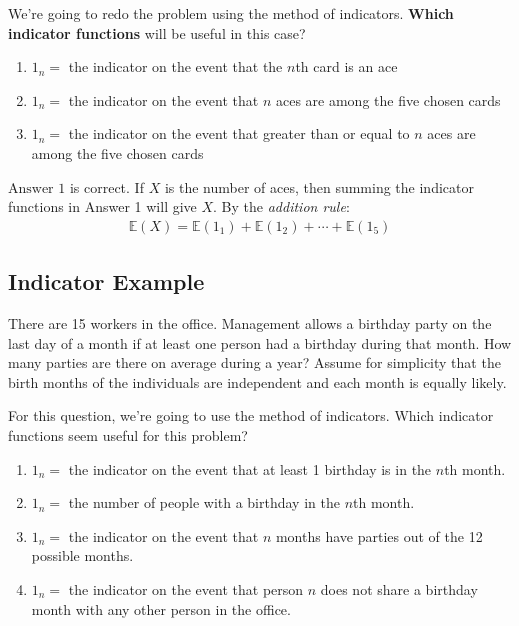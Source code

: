 \documentclass[titlepage, 12pt, leqno]{article}
\begin{document}
\begin{ex}
    We're going to redo the problem using the method of indicators. \textbf{Which 
    indicator functions} will be useful in this case?
    \begin{enumerate}
        \item $1_n = $ the indicator on the event that the $n$th card is an ace
        \item $1_n =$ the indicator on the event that $n$ aces are among the
            five chosen cards
        \item $1_n =$ the indicator on the event that greater than or equal to
            $n$ aces are among the five chosen cards
    \end{enumerate}
    \vspace{10px}
    $\boxed{ \text{Answer 1}}$ is correct. If $X$ is the number of aces, then
    summing the indicator functions in Answer 1 will give $X$. By the
    \textit{addition rule}:
   \begin{align*}
       \mathbb{E}(X) = \mathbb{E}(1_1) + \mathbb{E}(1_2) + \cdots + 
       \mathbb{E}(1_5)
   \end{align*}
\end{ex}

\pagebreak
\subsection{Indicator Example}
There are 15 workers in the office. Management allows a birthday party on the 
last day of a month if at least one person had a birthday during that month. How
many parties are there on average during a year? Assume for simplicity that the 
birth months of the individuals are independent and each month is equally likely.

\begin{ex}
    For this question, we're going to use the method of indicators. Which 
    indicator functions seem useful for this problem?
    \begin{enumerate}
        \item $1_n =$ the indicator on the event that at least 1 birthday is in 
            the $n$th month.
        \item $1_n = $ the number of people with a birthday in the $n$th month.
        \item $1_n = $ the indicator on the event that $n$ months have parties
            out of the 12 possible months.
        \item $1_n = $ the indicator on the event that person $n$ does not share
            a birthday month with any other person in the office.
    \end{enumerate}
\end{ex}
\end{document}
